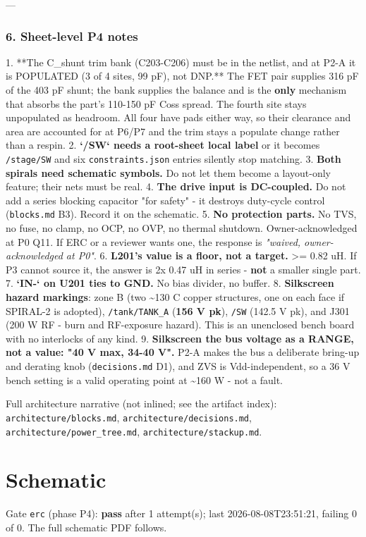 \documentclass[11pt,a4paper]{article}
\begin{document}
---

\subsubsection*{6. Sheet-level P4 notes}
1. {*}{*}The C\_shunt trim bank (C203-C206) must be in the netlist, and at P2-A it is POPULATED (3 of 4 sites, 99 pF), not DNP.{*}{*} The FET pair supplies 316 pF of the 403 pF shunt; the bank supplies the balance and is the \textbf{only} mechanism that absorbs the part's 110-150 pF Coss spread. The fourth site stays unpopulated as headroom. All four have pads either way, so their clearance and area are accounted for at P6/P7 and the trim stays a populate change rather than a respin. 2. \textbf{`/SW` needs a root-sheet local label} or it becomes \texttt{/stage/SW} and six \texttt{constraints.json} entries silently stop matching. 3. \textbf{Both spirals need schematic symbols.} Do not let them become a layout-only feature; their nets must be real. 4. \textbf{The drive input is DC-coupled.} Do not add a series blocking capacitor "for safety" - it destroys duty-cycle control (\texttt{blocks.md} B3). Record it on the schematic. 5. \textbf{No protection parts.} No TVS, no fuse, no clamp, no OCP, no OVP, no thermal shutdown. Owner-acknowledged at P0 Q11. If ERC or a reviewer wants one, the response is \emph{"waived, owner-acknowledged at P0"}. 6. \textbf{L201's value is a floor, not a target.} \textgreater{}= 0.82 uH. If P3 cannot source it, the answer is 2x 0.47 uH in series - \textbf{not} a smaller single part. 7. \textbf{`IN-` on U201 ties to GND.} No bias divider, no buffer. 8. \textbf{Silkscreen hazard markings}: zone B (two \textasciitilde{}130 C copper structures, one on each face if SPIRAL-2 is adopted), \texttt{/tank/TANK\_A} (\textbf{156 V pk}), \texttt{/SW} (142.5 V pk), and J301 (200 W RF - burn and RF-exposure hazard). This is an unenclosed bench board with no interlocks of any kind. 9. \textbf{Silkscreen the bus voltage as a RANGE, not a value: "40 V max, 34-40 V".} P2-A makes the bus a deliberate bring-up and derating knob (\texttt{decisions.md} D1), and ZVS is Vdd-independent, so a 36 V bench setting is a valid operating point at \textasciitilde{}160 W - not a fault.

Full architecture narrative (not inlined; see the artifact index): \texttt{architecture/blocks.md}, \texttt{architecture/decisions.md}, \texttt{architecture/power\_tree.md}, \texttt{architecture/stackup.md}.
\section{Schematic}
Gate \texttt{erc} (phase P4): \textbf{pass} after 1 attempt(s); last 2026-08-08T23:51:21, failing 0 of 0.
The full schematic PDF follows.

\end{document}
